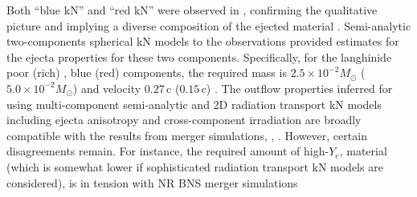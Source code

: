 Both ``blue \ac{kN}'' and ``red \ac{kN}'' were observed in \AT{}, 
confirming the qualitative picture and implying a diverse composition 
of the ejected material \citep[\eg][]{Villar:2017wcc}.
%
Semi-analytic two-components spherical \ac{kN} models to 
the \AT{} observations provided estimates for the ejecta properties 
for these two components. 
%
Specifically, for the langhinide poor (rich) \ie, blue (red) components, 
the required mass is $2.5\times10^{-2}M_{\odot}$ ($5.0\times10^{-2}M_{\odot}$) 
and velocity $0.27\,$c ($0.15\,$c) \citep{Cowperthwaite:2017dyu,Villar:2017wcc}. 
%
The outflow properties inferred for \AT{} using multi-component semi-analytic and 
2D radiation transport \ac{kN} models including ejecta anisotropy and 
cross-component irradiation are broadly compatible with the results from 
merger simulations, \eg, \citep{Kawaguchi:2018ptg}. %
%
%
However, certain disagreements remain. 
For instance, the required amount of high-$Y_e$, material 
(which is somewhat lower if sophisticated radiation transport 
\ac{kN} models are considered), is in tension with \ac{NR} \ac{BNS} merger simulations 
